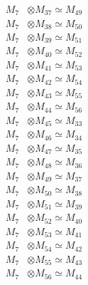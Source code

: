 \begin{align*}
M_{7} &\otimes M_{37} \simeq M_{49} \\
M_{7} &\otimes M_{38} \simeq M_{50} \\
M_{7} &\otimes M_{39} \simeq M_{51} \\
M_{7} &\otimes M_{40} \simeq M_{52} \\
M_{7} &\otimes M_{41} \simeq M_{53} \\
M_{7} &\otimes M_{42} \simeq M_{54} \\
M_{7} &\otimes M_{43} \simeq M_{55} \\
M_{7} &\otimes M_{44} \simeq M_{56} \\
M_{7} &\otimes M_{45} \simeq M_{33} \\
M_{7} &\otimes M_{46} \simeq M_{34} \\
M_{7} &\otimes M_{47} \simeq M_{35} \\
M_{7} &\otimes M_{48} \simeq M_{36} \\
M_{7} &\otimes M_{49} \simeq M_{37} \\
M_{7} &\otimes M_{50} \simeq M_{38} \\
M_{7} &\otimes M_{51} \simeq M_{39} \\
M_{7} &\otimes M_{52} \simeq M_{40} \\
M_{7} &\otimes M_{53} \simeq M_{41} \\
M_{7} &\otimes M_{54} \simeq M_{42} \\
M_{7} &\otimes M_{55} \simeq M_{43} \\
M_{7} &\otimes M_{56} \simeq M_{44} \\
\end{align*}

